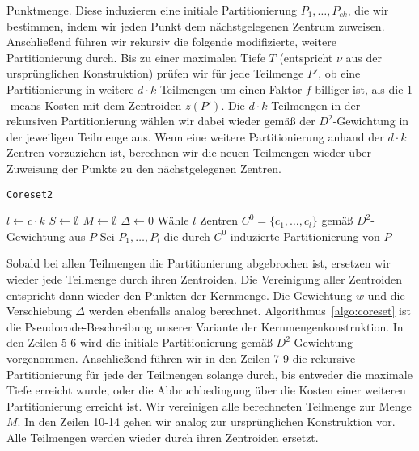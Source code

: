 Punktmenge. Diese induzieren eine initiale Partitionierung $P_1, \dots, P_{ck}$, die wir bestimmen, indem wir jeden
Punkt dem nächstgelegenen Zentrum zuweisen. Anschließend führen wir rekursiv die folgende modifizierte, weitere Partitionierung
durch.
Bis zu einer maximalen Tiefe $T$ (entspricht $\nu$ aus der ursprünglichen Konstruktion) prüfen wir für jede
Teilmenge $P'$, ob eine Partitionierung in weitere $d \cdot k$ Teilmengen um einen Faktor $f$ billiger ist, als die
$1$-means-Kosten mit dem Zentroiden $z(P')$. Die $d \cdot k$ Teilmengen in der rekursiven Partitionierung wählen wir dabei
wieder gemäß der $D^2$-Gewichtung in der jeweiligen Teilmenge aus. Wenn eine weitere Partitionierung anhand der $d \cdot k$
Zentren vorzuziehen ist, berechnen wir die neuen Teilmengen wieder über Zuweisung der Punkte zu den nächstgelegenen Zentren.

\begin{algorithm}
\caption{\texttt{Coreset2}}
\label{algo:coreset}
	\DontPrintSemicolon
	
	\BlankLine
	
	$l \leftarrow c \cdot k$\;
	$S \leftarrow \emptyset$\;
	$M \leftarrow \emptyset$\;
	$\Delta \leftarrow 0$\;
	Wähle $l$ Zentren $C^0 = \{c_1, \dots, c_l\}$ gemäß $D^2$-Gewichtung aus $P$\;
	Sei $P_1, \dots, P_l$ die durch $C^0$ induzierte Partitionierung von $P$\;
\end{algorithm}
Sobald bei allen Teilmengen die Partitionierung abgebrochen ist, ersetzen wir wieder jede Teilmenge durch ihren Zentroiden. Die
Vereinigung aller Zentroiden entspricht dann wieder den Punkten der Kernmenge. Die Gewichtung $w$ und die Verschiebung $\Delta$
werden ebenfalls analog berechnet.
\absatz
Algorithmus~\ref{algo:coreset} ist die Pseudocode-Beschreibung unserer Variante der Kernmengenkonstruktion. In den Zeilen
5-6 wird die initiale Partitionierung gemäß $D^2$-Gewichtung vorgenommen. Anschließend führen wir in den Zeilen 7-9 die
rekursive Partitionierung für jede der Teilmengen solange durch, bis entweder die maximale Tiefe erreicht wurde, oder die
Abbruchbedingung über die Kosten einer weiteren Partitionierung erreicht ist. Wir vereinigen alle berechneten Teilmenge zur
Menge $M$. In den Zeilen 10-14 gehen wir analog zur ursprünglichen Konstruktion vor. Alle Teilmengen werden wieder durch ihren
Zentroiden ersetzt.

